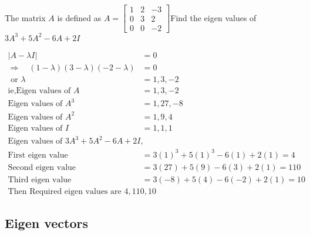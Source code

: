 \begin{exercise}
	 The matrix $A$ is defined as $A=\left[\begin{array}{rrr}1 & 2 & -3 \\ 0 & 3 & 2 \\ 0 & 0 & -2\end{array}\right]$Find the eigen values of $3 A^{3}+5 A^{2}-6 A+2 I$
	\end{exercise}
\begin{answer}
	 
	\begin{align*}
		|A-\lambda I|&=0\\
		\Rightarrow \quad(1-\lambda)(3-\lambda)(-2-\lambda)&=0\\ \text { or } \lambda&=1,3,-2\\
		\text{ie,Eigen values of } A&=1,3,-2\\
		\text{Eigen values of } A^{3}&=1,27,-8\\
		\text{Eigen values of }A^{2}&=1,9,4\\
		\text{Eigen values of }I&=1,1,1\\
		\text{Eigen values of }3 A^{3}+5 A^{2}-6 A+2 I,\\
		\text{First eigen value}&=3(1)^{3}+5(1)^{3}-6(1)+2(1)=4\\	
		\text{Second eigen value}&=3(27)+5(9)-6(3)+2(1)=110\\
		\text{Third eigen value}&=3(-8)+5(4)-6(-2)+2(1)=10\\\text{Then Required eigen values are } 4,110,10
	\end{align*}
	
\end{answer}
	
\subsection{Eigen vectors}
